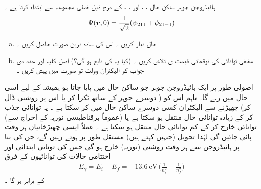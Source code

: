 ہائیڈروجن  جوہر ساکن  حال ، ،   اور  ، ،   کے درج ذیل خطی  مجموعہ   سے ابتداء کرتا ہے ۔
\begin{align*}
\Psi({{\boldsymbol{r}}},0)=\frac{1}{\sqrt{2}}(\psi_{211}+\psi_{21-1})
\end{align*}
\begin{enumerate}[a.]
\item
حال  تیار کریں ۔ اس کی سادہ ترین صورت حاصل کریں ۔
\item
مخفی توانائی  کی توقعاتی قیمت ی    تلاش کریں ۔ (کیا یہ   کی  تابع ہو گی؟)  اصل کلیہ اور عدد دی جواب   کو الیکٹران وولٹ تو صورت میں پیش کریں ۔
\end{enumerate}

اصولی طور پر ایک ہائیڈروجن جوہر جو ساکن حال  میں پایا جاتا ہو  ہمیشہ کے لیے اسی حال میں رہے گا۔ تاہم اس کو (  دوسرے جوہر کے ساتھ ٹکرا کر  یا اس پر روشنی  ڈال کر)  چھیڑنے سے الیکٹران کسی دوسرے ساکن حال میں  کر سکتا ہے ۔ یہ توانائی جذب کر کے زیادہ توانائی  حال منتقل ہو سکتا ہے یا   (عموماً   برقناطیسی   نوریہ کے  اخراج   سے)     توانائی خارج کر  کے کم توانائی  حال  منتقل ہو سکتا ہے ۔ عملاً  ایسی چھیڑخانیاں  ہر وقت پائی جائیں گی لہٰذا  تحویل  (جنہیں   کہتے ہیں)   مستقل طور پر ہوتے  رہیں    گے، جن  کی  بنا پر  ہائیڈروجن  سے ہر وقت   روشنی (نوریہ)  خارج ہو گی جس کی تونائی   ابتدائی اور اختتامی حالات کی  توانائیوں  کے فرق
\begin{align}
E_{\gamma}=E_{i}-E_{f}=\SI{-13.6}{\electronvolt}\,\big(\frac{1}{n^{2}_{i}}-\frac{1}{n^{2}_{f}}\big)
\end{align}
 کے برابر ہو گا ۔
 
